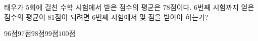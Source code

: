 태우가 $5$회에 걸친 수학 시험에서 받은 점수의 평균은 $78$점이다. $6$번째 시험까지 얻은 점수의 평균이 $81$점이 되려면 $6$번째 시험에서 몇 점을 받아야 하는가?
\begin{choices32}{$96$점}{$97$점}{$98$점}{$99$점}{$100$점}\end{choices32}
